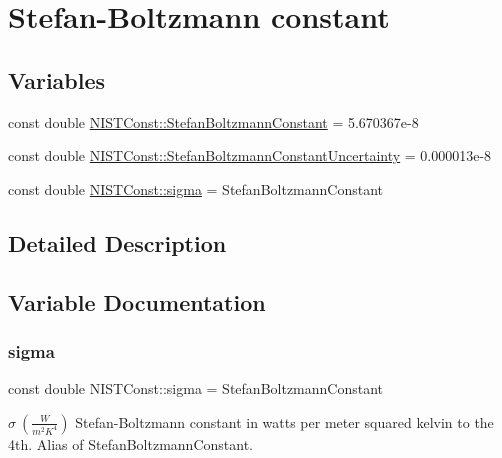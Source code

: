 \hypertarget{group___stefan_boltzmann_constant}{}\section{Stefan-\/\+Boltzmann constant}
\label{group___stefan_boltzmann_constant}
\subsection*{Variables}
\begin{DoxyCompactItemize}
\item 
const double \hyperlink{group___stefan_boltzmann_constant_ga1094e420290686333202d186399d706d}{N\+I\+S\+T\+Const\+::\+Stefan\+Boltzmann\+Constant} = 5.\+670367e-\/8
\item 
const double \hyperlink{group___stefan_boltzmann_constant_ga98b40b4f7ea1cd358d0a140bf8f6973c}{N\+I\+S\+T\+Const\+::\+Stefan\+Boltzmann\+Constant\+Uncertainty} = 0.\+000013e-\/8
\item 
const double \hyperlink{group___stefan_boltzmann_constant_ga73dd51ea1c04650cc4d93c7a454c7b8f}{N\+I\+S\+T\+Const\+::sigma} = Stefan\+Boltzmann\+Constant
\end{DoxyCompactItemize}


\subsection{Detailed Description}


\subsection{Variable Documentation}
\mbox{\label{group___stefan_boltzmann_constant_ga73dd51ea1c04650cc4d93c7a454c7b8f}} 
\subsubsection{\texorpdfstring{sigma}{sigma}}
{\footnotesize\ttfamily const double N\+I\+S\+T\+Const\+::sigma = Stefan\+Boltzmann\+Constant}

$\sigma \ (\frac{W}{m^2 K^4})$ Stefan-\/\+Boltzmann constant in watts per meter squared kelvin to the 4th. Alias of Stefan\+Boltzmann\+Constant. \mbox{\label{group___stefan_boltzmann_constant_ga1094e420290686333202d186399d706d}} 
